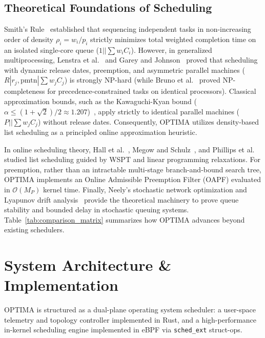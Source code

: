 \documentclass[conference]{IEEEtran}
\begin{document}
\subsection{Theoretical Foundations of Scheduling}
Smith's Rule~\cite{smith1956various} established that sequencing independent tasks in non-increasing order of density $\rho_i = w_i / p_i$ strictly minimizes total weighted completion time on an isolated single-core queue ($1 || \sum w_i C_i$). However, in generalized multiprocessing, Lenstra et al.~\cite{lenstra1977complexity} and Garey and Johnson~\cite{garey1979computers} proved that scheduling with dynamic release dates, preemption, and asymmetric parallel machines ($R | r_j, \text{pmtn} | \sum w_j C_j$) is strongly NP-hard (while Bruno et al.~\cite{bruno1974sequencing} proved NP-completeness for precedence-constrained tasks on identical processors). Classical approximation bounds, such as the Kawaguchi-Kyan bound ($\alpha \le (1+\sqrt{2})/2 \approx 1.207$)~\cite{kawaguchi1986worst}, apply strictly to identical parallel machines ($P || \sum w_j C_j$) without release dates. Consequently, OPTIMA utilizes density-based list scheduling as a principled online approximation heuristic. 

In online scheduling theory, Hall et al.~\cite{hall1997scheduling}, Megow and Schulz~\cite{megow2004online}, and Phillips et al.~\cite{phillips1998minimizing} studied list scheduling guided by WSPT and linear programming relaxations. For preemption, rather than an intractable multi-stage branch-and-bound search tree, OPTIMA implements an Online Admissible Preemption Filter (OAPF) evaluated in $\mathcal{O}(M_P)$ kernel time. Finally, Neely's stochastic network optimization and Lyapunov drift analysis~\cite{neely2010stochastic,neely2006energy,georgiadis2006resource} provide the theoretical machinery to prove queue stability and bounded delay in stochastic queuing systems. Table~\ref{tab:comparison_matrix} summarizes how OPTIMA advances beyond existing schedulers.

\section{System Architecture \& Implementation}
\label{sec:architecture}

OPTIMA is structured as a dual-plane operating system scheduler: a user-space telemetry and topology controller implemented in Rust, and a high-performance in-kernel scheduling engine implemented in eBPF via \texttt{sched\_ext} struct-ops.
\end{document}
